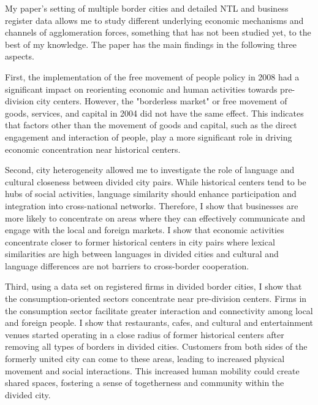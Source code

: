 \documentclass[12pt]{article}    %
\begin{document}
\par My paper's setting of multiple border cities and detailed NTL and business register data allows me to study different underlying economic mechanisms  and channels of agglomeration forces, something that has not been studied yet, to the best of my knowledge. The paper has the main findings in the following three aspects. 


\par First, the implementation of the free movement of people policy in 2008 had a significant impact on reorienting economic and human activities towards pre-division city centers. However, the "borderless market" or free movement of goods, services, and capital in 2004 did not have the same effect. This indicates that factors other than the movement of goods and capital, such as the direct engagement and interaction of people, play a more significant role in driving economic concentration near historical centers.


\par Second, city heterogeneity allowed me to investigate the role of language and cultural closeness between divided city pairs. While historical centers tend to be hubs of social activities, language similarity should enhance participation and integration into cross-national networks.  Therefore, I show that businesses are more likely to concentrate on areas where they can effectively communicate and engage with the local and foreign markets. I show that economic activities concentrate closer to former historical centers in city pairs where lexical similarities are high between languages in divided cities and cultural and language differences are not barriers to cross-border cooperation. 


\par Third, using a data set on registered firms in divided border cities, I show that the consumption-oriented sectors concentrate near pre-division centers.  Firms in the consumption sector facilitate greater interaction and connectivity among local and foreign people. I show that  restaurants, cafes, and cultural and entertainment venues started operating in a close radius of former historical centers after removing all types of borders in divided cities. Customers from both sides of the formerly united city can come to these areas, leading to increased physical movement and social interactions. This increased human mobility could create shared spaces, fostering a sense of togetherness and community within the divided city.
\end{document}

